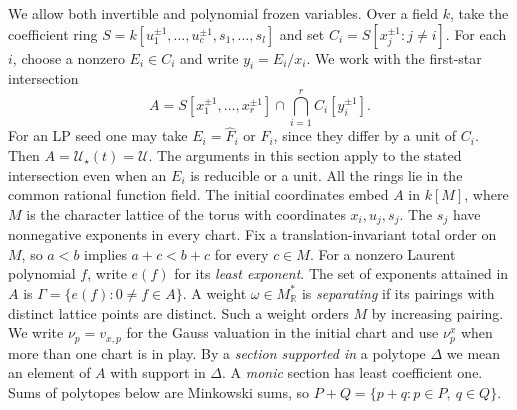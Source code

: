\documentclass[11pt,reqno]{amsart}
\numberwithin{equation}{section}
\theoremstyle{definition}
\theoremstyle{remark}
\begin{document}
We allow both invertible and polynomial frozen variables. Over a
field \(k\), take the coefficient ring
\(S=k[u_1^{\pm1},\ldots,u_c^{\pm1},s_1,\ldots,s_l]\) and set
\(C_i=S[x_j^{\pm1}:j\ne i]\). For each \(i\), choose
a nonzero \(E_i\in C_i\) and write \(y_i=E_i/x_i\). We work with the
first-star intersection
\[ A=S[x_1^{\pm1},\ldots,x_r^{\pm1}]\cap\bigcap_{i=1}^r C_i[y_i^{\pm1}]. \]
For an LP seed one may take \(E_i=\widehat F_i\) or \(F_i\), since
they differ by a unit of \(C_i\). Then \(A=\mathcal U_\star(t)=\mathcal U\).
The arguments in this section apply to the stated intersection even
when an \(E_i\) is reducible or a unit. All the rings lie in the common
rational function field. The initial coordinates embed \(A\) in \(k[M]\),
where \(M\) is the character lattice of the torus with coordinates
\(x_i,u_j,s_j\). The \(s_j\) have nonnegative exponents in every chart.
Fix a translation-invariant total order on \(M\), so \(a<b\)
implies \(a+c<b+c\) for every \(c\in M\). For a nonzero Laurent polynomial \(f\), write
\(e(f)\) for its \emph{least exponent}. The set of exponents attained
in \(A\) is \(\Gamma=\{e(f):0\ne f\in A\}\). A weight
\(\omega\in M^*_{\mathbb R}\) is \emph{separating} if its pairings
with distinct lattice points are distinct. Such a weight orders \(M\)
by increasing pairing. We write \(\nu_p=v_{x,p}\) for the Gauss
valuation in the initial chart and use \(\nu^x_p\) when more than one
chart is in play. By a \emph{section supported in} a polytope
\(\Delta\) we mean an element of \(A\) with support in \(\Delta\).
A \emph{monic} section has least coefficient one.
Sums of polytopes below are Minkowski sums, so \(P+Q=\{p+q:p\in P,\ q\in Q\}\).
\end{document}
